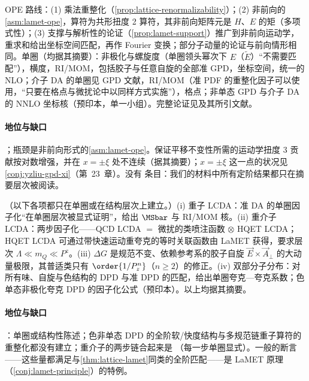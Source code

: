 \begin{proofsketch}
OPE 路线：(1) 乘法重整化（\cref{prop:lattice-renormalizability}）；(2) 非前向的\cref{asm:lamet-ope}，算符为共形扭度 2 算符，其非前向矩阵元是 $H$、$E$ 的矩（多项式性）；(3) 支撑与解析性的论证（\cref{prop:lamet-support}）推广到非前向运动学，重求和给出坐标空间匹配，再作 Fourier 变换；部分子动量的论证与前向情形相同。单圈（均据其摘要）：非极化与螺旋度\cite{Ji:2015qla}（单圈领头幂次下 $E$（$\tilde E$）“不需要匹配”），横度\cite{Xiong:2015nua}，RI/MOM\cite{Liu:2019urm}，包括胶子与任意自旋的全部准 GPD\cite{Ma:2022ggj}，坐标空间\cite{Radyushkin:2019owq}，统一的 NLO\cite{Yao:2022vtp}；介子 DA 的单圈见 GPD 文献，RI/MOM\cite{Liu:2018tox}（准 PDF 的重整化因子可以使用，“只要在格点与微扰论中以同样方式实施”），格点\cite{Zhang:2017bzy,LatticeParton:2022zqc,Holligan:2023rex}；非单态 GPD 与介子 DA 的 NNLO 坐标核\cite{Ji:2025mvk}（预印本，单一小组）。完整论证见\cite{JiEtAl2021}及其所引文献。
\end{proofsketch}

\paragraph{地位与缺口}
\tagA；瓶颈是非前向形式的\cref{asm:lamet-ope}。保证平移不变性所需的运动学扭度 3 贡献按对数增强，并在 $x=\pm\xi$ 处不连续\cite{Braun:2023alc}（据其摘要）；$x=\pm\xi$ 这一点的状况见\cref{conj:yzliu-gpd-xi}（第~23~章）。没有 \tagR 条目：我们的材料中所有定阶结果都只在摘要层次被阅读。

\begin{proposition}\label{prop:lamet-other-objects}
（以下各项都只在单圈或在结构层次上建立。）(i) 重子 LCDA：准 DA 的单圈因子化“在单圈层次被显式证明”，给出 $\MSbar$ 与 RI/MOM 核\cite{Deng:2023csv}。(ii) 重介子 LCDA：两步因子化——QCD LCDA $=$ 微扰的类喷注函数 $\otimes$ HQET LCDA\cite{Beneke:2023nmj}；HQET LCDA 可通过带快速运动重夸克的等时关联函数由 LaMET 获得\cite{Han:2024fkr}，要求层次 $\Lambda\ll m_Q\ll P^z$。(iii) $\Delta G$ 是规范不变、依赖参考系的胶子自旋 $\vec E\times\vec A_\perp$ 的大动量极限\cite{Ji:2013fga}，其普适类只有 $\order{1/P_z^n}$（$n\ge2$）的修正\cite{Hatta:2013gta}。(iv) 双部分子分布：对所有味、自旋与色结构的 DPD 与准 DPD 的匹配，给出单圈夸克—夸克系数\cite{Jaarsma:2023woo}；色单态非极化夸克 DPD 的因子化公式\cite{Zhang:2023wea}（预印本）。以上均据其摘要。
\end{proposition}

\paragraph{地位与缺口}
\tagP：单圈或结构性陈述；色非单态 DPD 的全阶软/快度结构与多规范链重子算符的重整化都没有建立；重介子的两步链合起来是 \tagP（每一步单圈显式）。一般的断言——这些量都满足与\cref{thm:lattice-lamet}同类的全阶匹配——是 LaMET 原理（\cref{conj:lamet-principle}）的特例。

